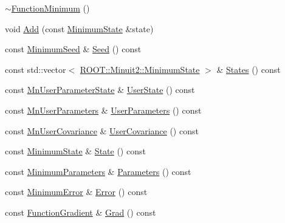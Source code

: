 \begin{DoxyCompactItemize}
\item 
\mbox{\hyperlink{classROOT_1_1Minuit2_1_1FunctionMinimum_aaaef452fc02a74a63a9390329ed1dd04}{$\sim$\+Function\+Minimum}} ()
\item 
void \mbox{\hyperlink{classROOT_1_1Minuit2_1_1FunctionMinimum_a13b69e2d431d568f4485eb8b79d6c781}{Add}} (const \mbox{\hyperlink{classROOT_1_1Minuit2_1_1MinimumState}{Minimum\+State}} \&state)
\item 
const \mbox{\hyperlink{classROOT_1_1Minuit2_1_1MinimumSeed}{Minimum\+Seed}} \& \mbox{\hyperlink{classROOT_1_1Minuit2_1_1FunctionMinimum_a9812689b192b202a73ce1178e8098705}{Seed}} () const
\item 
const std\+::vector$<$ \mbox{\hyperlink{classROOT_1_1Minuit2_1_1MinimumState}{R\+O\+O\+T\+::\+Minuit2\+::\+Minimum\+State}} $>$ \& \mbox{\hyperlink{classROOT_1_1Minuit2_1_1FunctionMinimum_a5f08def4f7ca92700393d42ded6eb237}{States}} () const
\item 
const \mbox{\hyperlink{classROOT_1_1Minuit2_1_1MnUserParameterState}{Mn\+User\+Parameter\+State}} \& \mbox{\hyperlink{classROOT_1_1Minuit2_1_1FunctionMinimum_a698dc320ec24e2288f391f160ef8213e}{User\+State}} () const
\item 
const \mbox{\hyperlink{classROOT_1_1Minuit2_1_1MnUserParameters}{Mn\+User\+Parameters}} \& \mbox{\hyperlink{classROOT_1_1Minuit2_1_1FunctionMinimum_ac916253d7e29de7da4da5bf4b84a2ad5}{User\+Parameters}} () const
\item 
const \mbox{\hyperlink{classROOT_1_1Minuit2_1_1MnUserCovariance}{Mn\+User\+Covariance}} \& \mbox{\hyperlink{classROOT_1_1Minuit2_1_1FunctionMinimum_aeb3d5cb9f9c49838fa4b08668c8556db}{User\+Covariance}} () const
\item 
const \mbox{\hyperlink{classROOT_1_1Minuit2_1_1MinimumState}{Minimum\+State}} \& \mbox{\hyperlink{classROOT_1_1Minuit2_1_1FunctionMinimum_aa57279a22070860400c8854289c84314}{State}} () const
\item 
const \mbox{\hyperlink{classROOT_1_1Minuit2_1_1MinimumParameters}{Minimum\+Parameters}} \& \mbox{\hyperlink{classROOT_1_1Minuit2_1_1FunctionMinimum_a069ba097db08f87582b309330ef8aa6e}{Parameters}} () const
\item 
const \mbox{\hyperlink{classROOT_1_1Minuit2_1_1MinimumError}{Minimum\+Error}} \& \mbox{\hyperlink{classROOT_1_1Minuit2_1_1FunctionMinimum_a24f73efe7b4ed139bcf28e62ab01b347}{Error}} () const
\item 
const \mbox{\hyperlink{classROOT_1_1Minuit2_1_1FunctionGradient}{Function\+Gradient}} \& \mbox{\hyperlink{classROOT_1_1Minuit2_1_1FunctionMinimum_ac97896abe1c4625c519c2b07e4e9b670}{Grad}} () const

\end{DoxyCompactItemize}
